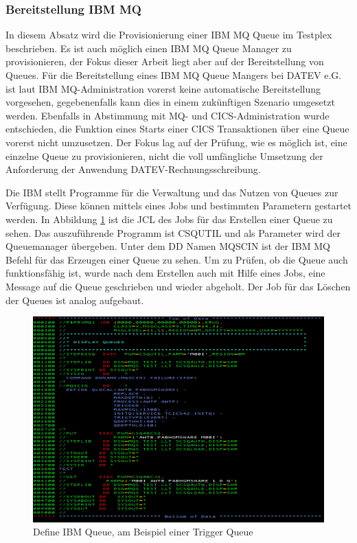 \subsubsection{Bereitstellung IBM MQ}\label{sssec:mqtplx}
In diesem Absatz wird die Provisionierung einer IBM MQ Queue im Testplex beschrieben. 
Es ist auch möglich einen IBM MQ Queue Manager zu provisionieren, der Fokus dieser Arbeit liegt aber auf der Bereitstellung von Queues. 
Für die Bereitstellung eines IBM MQ Queue Mangers bei DATEV e.G. ist laut IBM MQ-Administration vorerst keine automatische Bereitstellung vorgesehen, gegebenenfalls kann dies in einem zukünftigen Szenario umgesetzt werden.
Ebenfalls in Abstimmung mit MQ- und CICS-Administration wurde entschieden, die Funktion eines Starts einer CICS Transaktionen über eine Queue vorerst nicht umzusetzen. Der Fokus lag auf der Prüfung, wie es möglich ist, eine einzelne Queue zu provisionieren, nicht die voll umfängliche Umsetzung der Anforderung der Anwendung DATEV-Rechnungsschreibung. 

Die IBM stellt Programme für die Verwaltung und das Nutzen von Queues  zur Verfügung.
Diese können mittels eines Jobs und bestimmten Parametern gestartet werden.
In Abbildung \ref{code:defq} ist die JCL des Jobs für das Erstellen einer Queue zu sehen.
Das auszuführende Programm ist \glqq CSQUTIL\grqq{} und als Parameter wird der Queuemanager übergeben.
Unter dem DD Namen \glqq MQSCIN\grqq{} ist der IBM MQ Befehl für das Erzeugen einer Queue zu sehen.
Um zu Prüfen, ob die Queue auch funktionsfähig ist, wurde nach dem Erstellen auch mit Hilfe eines Jobs, eine Message auf die Queue geschrieben und wieder abgeholt.
Der Job für das Löschen der Queues ist analog aufgebaut.

\begin{figure}[h]
	\centering
	\includegraphics[width=\textwidth]{figures/defqjcl.PNG}
	\caption{Define IBM Queue, am Beispiel einer Trigger Queue}
	\label{code:defq}
\end{figure}

